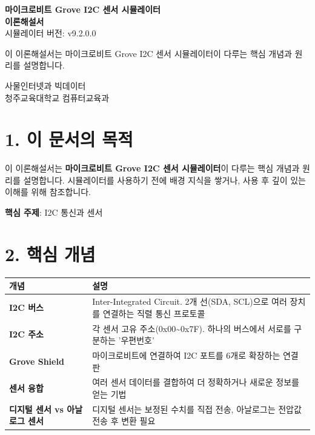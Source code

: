 \documentclass[11pt,a4paper]{article}
\begin{document}
\begin{titlepage}
\centering
\vspace*{3cm}
{\Huge\bfseries\color{primary} 마이크로비트 Grove I2C 센서 시뮬레이터}\\[0.5cm]
{\Huge\bfseries\color{primary} 이론해설서}
\\[1.5cm]
{\Large 시뮬레이터 버전: v9.2.0.0}
\\[2cm]
\begin{tcolorbox}[summarybox]
\centering
{\large 이 이론해설서는 마이크로비트 Grove I2C 센서 시뮬레이터이 다루는 핵심 개념과 원리를 설명합니다.}
\end{tcolorbox}
\vfill
{\large 사물인터넷과 빅데이터}\\[0.3cm]
{\large 청주교육대학교 컴퓨터교육과}
\vspace{1cm}
\end{titlepage}

\section*{1. 이 문서의 목적}

이 이론해설서는 \textbf{마이크로비트 Grove I2C 센서 시뮬레이터}이 다루는 핵심 개념과 원리를 설명합니다. 시뮬레이터를 사용하기 전에 배경 지식을 쌓거나, 사용 후 깊이 있는 이해를 위해 참조합니다.


\begin{tcolorbox}[summarybox]
\textbf{핵심 주제}: I2C 통신과 센서

\end{tcolorbox}


\section*{2. 핵심 개념}

\begin{center}
\renewcommand{\arraystretch}{1.4}
\begin{tabular}{|p{4.1cm}|p{10.9cm}|}
\hline
\rowcolor{tableheader}
\textbf{개념} & \textbf{설명} \\
\hline
\textbf{I2C 버스} & Inter-Integrated Circuit. 2개 선(SDA, SCL)으로 여러 장치를 연결하는 직렬 통신 프로토콜 \\
\hline
\textbf{I2C 주소} & 각 센서 고유 주소(0x00\textasciitilde{}0x7F). 하나의 버스에서 서로를 구분하는 '우편번호' \\
\hline
\textbf{Grove Shield} & 마이크로비트에 연결하여 I2C 포트를 6개로 확장하는 연결판 \\
\hline
\textbf{센서 융합} & 여러 센서 데이터를 결합하여 더 정확하거나 새로운 정보를 얻는 기법 \\
\hline
\textbf{디지털 센서 vs 아날로그 센서} & 디지털 센서는 보정된 수치를 직접 전송, 아날로그는 전압값 전송 후 변환 필요 \\
\hline
\end{tabular}
\end{center}
\end{document}

